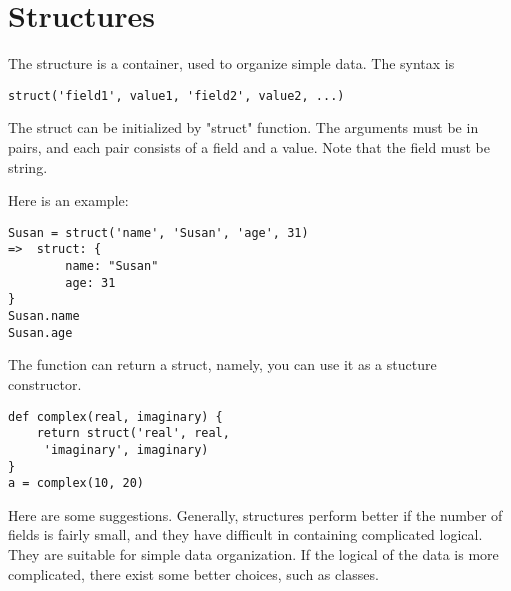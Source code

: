 \chapter{Structures}
The structure is a container, used to organize simple data. The syntax is
\begin{lstlisting}
struct('field1', value1, 'field2', value2, ...)
\end{lstlisting}
The struct can be initialized by "struct" function. The arguments must be in pairs, and each pair consists of a field and a value. Note that the field must be string.

Here is an example:
\begin{lstlisting}
Susan = struct('name', 'Susan', 'age', 31)
=>  struct: {
		name: "Susan"
		age: 31
}
Susan.name
Susan.age
\end{lstlisting}
The function can return a struct, namely, you can use it as a stucture constructor.

\begin{lstlisting}
def complex(real, imaginary) {
	return struct('real', real,
	 'imaginary', imaginary)
}
a = complex(10, 20)
\end{lstlisting}

Here are some suggestions. Generally, structures perform better if the number of fields is fairly small, and they have difficult in containing complicated logical. They are suitable for simple data organization. If the logical of the data is more complicated, there exist some better choices, such as classes. 
